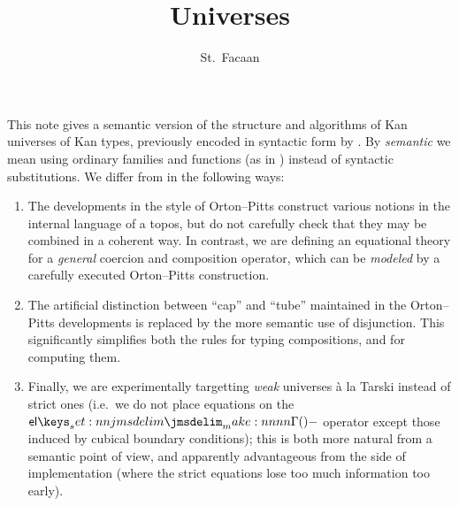 \documentclass[draft]{amsart}
\title{Universes}
\author{St.~Facaan}
\begin{document}
\maketitle

This note gives a semantic version of the structure and algorithms of Kan
universes of Kan types, previously encoded in syntactic form by
\citet{angiuli:2019}. By \emph{semantic} we mean using ordinary families and
functions (as in \citep{orton-pitts:2016,abcfhl:2019}) instead of syntactic
substitutions. We differ from \citep{orton-pitts:2016,abcfhl:2019} in the
following ways:

\begin{enumerate}

  \item The developments in the style of Orton--Pitts construct various notions
    in the internal language of a topos, but do not carefully check that they
    may be combined in a coherent way. In contrast, we are defining an
    equational theory for a \emph{general} coercion and composition operator,
    which can be \emph{modeled} by a carefully executed Orton--Pitts
    construction.

  \item The artificial distinction between ``cap'' and ``tube'' maintained in
    the Orton--Pitts developments is replaced by the more semantic use of
    disjunction. This significantly simplifies both the rules for typing
    compositions, and for computing them.

  \item Finally, we are experimentally targetting \emph{weak} universes \`a la
    Tarski instead of strict ones (i.e.\ we do not place equations on the
    $\TpEl{-}$ operator except those induced by cubical boundary conditions);
    this is both more natural from a semantic point of view, and apparently
    advantageous from the side of implementation (where the strict equations
    lose too much information too early).

\end{enumerate}
\end{document}
